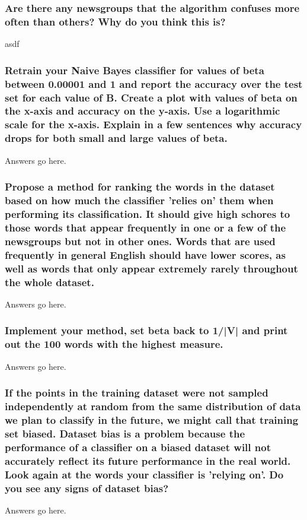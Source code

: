 \documentclass{IEEEtran}
\begin{document}
\subsubsection{Are there any newsgroups that the algorithm confuses more often than others? Why do you think this is?}
asdf

\subsubsection{Retrain your Naive Bayes classifier for values of beta between 0.00001 and 1 and report the accuracy over the test set for each value of B. Create a plot with values of beta on the x-axis and accuracy on the y-axis. Use a logarithmic scale for the x-axis. Explain in a few sentences why accuracy drops for both small and large values of beta.}
Answers go here.

\subsubsection{Propose a method for ranking the words in the dataset based on how much the classifier 'relies on' them when performing its classification. It should give high schores to those words that appear frequently in one or a few of the newsgroups but not in other ones. Words that are used frequently in general English should have lower scores, as well as words that only appear extremely rarely throughout the whole dataset.}
Answers go here.

\subsubsection{Implement your method, set beta back to 1/|V| and print out the 100 words with the highest measure.}
Answers go here.

\subsubsection{If the points in the training dataset were not sampled independently at random from the same distribution of data we plan to classify in the future, we might call that training set biased. Dataset bias is a problem because the performance of a classifier on a biased dataset will not accurately reflect its future performance in the real world. Look again at the words your classifier is 'relying on'. Do you see any signs of dataset bias?}
Answers go here.
\end{document}
